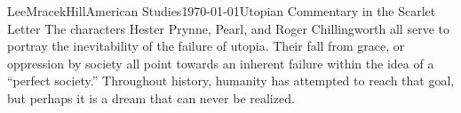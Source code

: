 \documentclass[12pt, letterpaper]{article}
\begin{document}
\begin{mla}{Lee}{Mracek}{Hill}{American Studies}{\today}{Utopian Commentary in the Scarlet Letter}
        The characters Hester Prynne, Pearl, and Roger Chillingworth all serve to portray the inevitability of the failure of utopia. Their fall from grace, or oppression by society all point towards an inherent failure within the idea of a ``perfect society.'' Throughout history, humanity has attempted to reach that goal, but perhaps it is a dream that can never be realized.
\end{mla}
\end{document}
